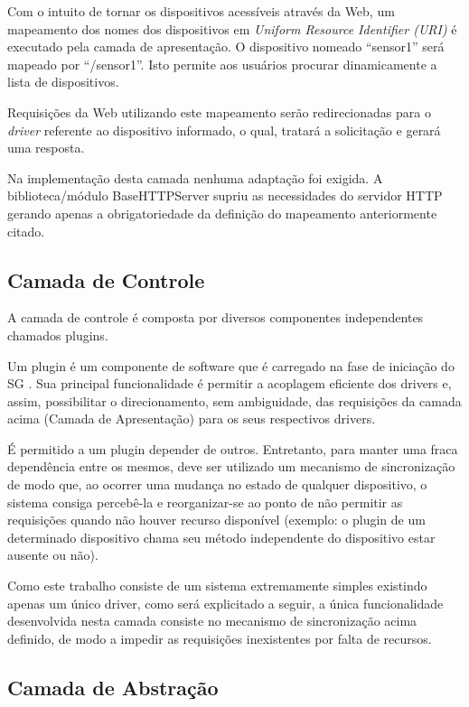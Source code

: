 \documentclass[12pt,a4paper,oneside]{report}
\begin{document}
Com o intuito de tornar os dispositivos acessíveis através da Web, um mapeamento dos nomes dos dispositivos em \emph{Uniform Resource Identifier (URI)} \cite{w3curi} é executado pela camada de apresentação. O dispositivo nomeado ``sensor1'' será mapeado por ``/sensor1''. Isto permite aos usuários procurar dinamicamente a lista de dispositivos.

Requisições da Web utilizando este mapeamento serão redirecionadas para o \emph{driver} referente ao dispositivo informado, o qual, tratará a solicitação e gerará uma resposta.

Na implementação desta camada nenhuma adaptação foi exigida. A biblioteca/módulo BaseHTTPServer supriu as necessidades do servidor HTTP gerando apenas a obrigatoriedade da definição do mapeamento anteriormente citado.

\subsection{Camada de Controle}

A camada de controle é composta por diversos componentes independentes chamados plugins.

Um plugin é um componente de software que é carregado na fase de iniciação do SG . Sua principal funcionalidade é permitir a acoplagem eficiente dos drivers e, assim, possibilitar o direcionamento, sem ambiguidade, das requisições da camada acima (Camada de Apresentação) para os seus respectivos drivers.

É permitido a um plugin depender de outros. Entretanto, para manter uma fraca dependência entre os mesmos, deve ser utilizado um mecanismo de sincronização de modo que, ao ocorrer uma mudança no estado de qualquer dispositivo, o sistema consiga percebê-la e reorganizar-se ao ponto de não permitir as requisições quando não houver recurso disponível (exemplo: o plugin de um determinado dispositivo chama seu método independente do dispositivo estar ausente ou não).

Como este trabalho consiste de um sistema extremamente simples existindo apenas um único driver, como será explicitado a seguir, a única funcionalidade desenvolvida nesta camada consiste no mecanismo de sincronização acima definido, de modo a impedir as requisições inexistentes por falta de recursos.

\subsection{Camada de Abstração}
\end{document}

